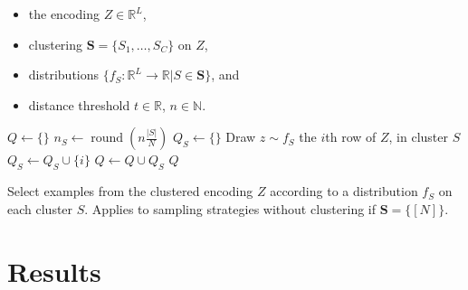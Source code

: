 \documentclass[a4paper]{article}
\DeclareMathOperator{\round}{round}
\begin{document}
\begin{algorithm}
  \begin{algorithmic}[1]
    \Require \hfill %
    \begin{itemize}
    \item the encoding $Z \in \mathbb{R}^L$,
    \item clustering $\mathbf{S} = \{S_1 , \dots, S_C\}$ on $Z$,
    \item distributions
      $\{f_S : \mathbb{R}^L \rightarrow \mathbb{R}| S \in \mathbf{S}\}$, and
    \item distance threshold
      $t \in \mathbb{R}$, $n \in \mathbb{N}$.
    \end{itemize}

    \State $Q \gets \{\}$ %
    \State $n_S \gets \round\left(n \frac{|S|}{N}\right) $ %
    \State $Q_S \gets \{\} $ %
    \State Draw $z \sim f_S$ %
     \Comment the $i$th row of $Z$, in cluster $S$ %
    \State $Q_S \gets Q_S \cup \{i\}$ %
    \EndIf %
    \EndFor %
    \EndWhile %
    \State $Q \gets Q \cup Q_S$ %
    \EndFor %
    \State \Return $Q$ %
  \end{algorithmic}
  \caption{Select examples from the clustered encoding $Z$ according to a
    distribution $f_S$ on each cluster $S$. Applies to sampling strategies
    without clustering if $\mathbf{S} = \{[N]\}$.}
  \label{alg:sampling}
\end{algorithm}

\section{Results}
\label{sec:results}
\end{document}
